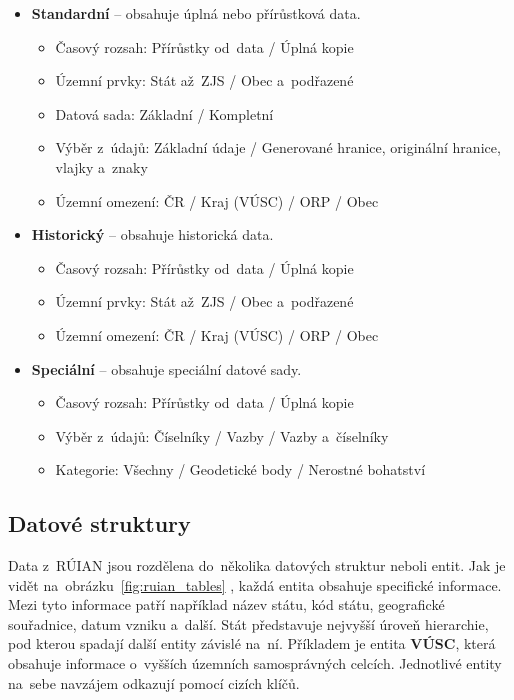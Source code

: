 \begin{itemize}
    \item \textbf{Standardní} -- obsahuje úplná nebo přírůstková data.
    \begin{itemize}[itemsep=-1pt]
        \item Časový rozsah: Přírůstky od~data / Úplná kopie
        \item Územní prvky: Stát až~ZJS / Obec a~podřazené
        \item Datová sada: Základní / Kompletní
        \item Výběr z~údajů: Základní údaje / Generované hranice, originální hranice, vlajky a~znaky
        \item Územní omezení: ČR / Kraj (VÚSC) / ORP / Obec
    \end{itemize}

    \item \textbf{Historický} -- obsahuje historická data.
    \begin{itemize}[itemsep=-1pt]
        \item Časový rozsah: Přírůstky od~data / Úplná kopie
        \item Územní prvky: Stát až~ZJS / Obec a~podřazené
        \item Územní omezení: ČR / Kraj (VÚSC) / ORP / Obec
    \end{itemize}

    \item \textbf{Speciální} -- obsahuje speciální datové sady.
    \begin{itemize}[itemsep=-1pt]
        \item Časový rozsah: Přírůstky od~data / Úplná kopie
        \item Výběr z~údajů: Číselníky / Vazby / Vazby a~číselníky
        \item Kategorie: Všechny / Geodetické body / Nerostné bohatství
    \end{itemize}
\end{itemize}

\subsection{Datové struktury}
Data z~RÚIAN jsou rozdělena do~několika datových struktur neboli entit.
Jak je vidět na~obrázku~\ref{fig:ruian_tables} \cite{ruian_vfr}, každá entita obsahuje specifické informace.
Mezi tyto informace patří například název státu, kód státu, geografické souřadnice, datum vzniku a~další.
Stát představuje nejvyšší úroveň hierarchie, pod kterou spadají další entity závislé na~ní.
Příkladem je entita \textbf{VÚSC}, která obsahuje informace o~vyšších územních samosprávných celcích.
Jednotlivé entity na~sebe navzájem odkazují pomocí cizích klíčů.

